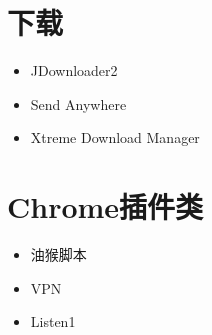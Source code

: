 \documentclass[UTF8,oneside]{ctexbook}
\begin{document}
\section{下载}
\begin{itemize}
	\item JDownloader2
	\item Send Anywhere
	\item Xtreme Download Manager
\end{itemize}

\section{Chrome插件类}
\begin{itemize}
	\item 油猴脚本
	\item VPN
	\item Listen1
\end{itemize}
\end{document}
